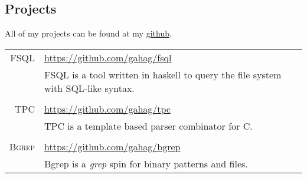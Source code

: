 \documentclass[a4paper,10pt]{article}
\newcommand{\cpp}{C\protect\scalebox{0.8}{\protect\raisebox{0.4ex}{++}}}
\renewcommand\#{\protect\scalebox{0.8}{\protect\raisebox{0.4ex}{\char"0023}}}
\begin{document}
\subsection{Projects}
All of my projects can be found at my \href{https://github.com/gahag/}{github}. \\[10pt]
\begin{tabular}{r|l}
  \textsc{FSQL} & \url{https://github.com/gahag/fsql} \\[3pt]
  & FSQL is a tool written in haskell to query the file system with SQL-like syntax. \\
  
  \multicolumn{2}{c}{} \\
  \textsc{TPC} & \url{https://github.com/gahag/tpc} \\[3pt]
  & TPC is a template based parser combinator for \cpp. \\

  \multicolumn{2}{c}{} \\
  \textsc{Bgrep} & \url{https://github.com/gahag/bgrep} \\[3pt]
  & Bgrep is a \textit{grep} spin for binary patterns and files. \\
\end{tabular}
\end{document}
